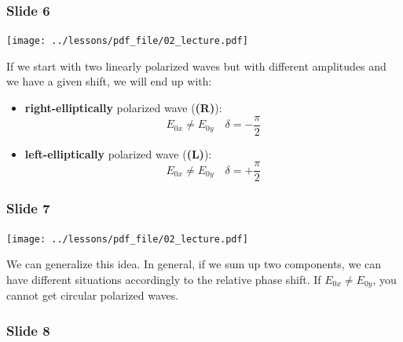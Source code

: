 \documentclass[../main/main.tex]{subfiles}
\begin{document}
\subsubsection*{Slide 6}

\begin{minipage}[]{0.5\linewidth}
\centering
\texttt{[image: ../lessons/pdf\_file/02\_lecture.pdf]}
\end{minipage}
\hspace{0.3cm}\vspace{0.3cm}
\begin{minipage}[c]{0.47\linewidth}
If we start with two linearly polarized waves but with different amplitudes and we have a given shift, we will end up with:
\begin{itemize}
    \item \textbf{right-elliptically} polarized wave (\textbf{(R)}):
    \begin{equation*}
      E_{0x} \neq E_{0y} \quad \delta = - \frac{\pi }{2}
    \end{equation*}

    \item \textbf{left-elliptically} polarized wave (\textbf{(L)}):
    \begin{equation*}
      E_{0x} \neq E_{0y} \quad \delta = + \frac{\pi }{2}
    \end{equation*}
\end{itemize}

\end{minipage}

\newpage

\subsubsection*{Slide 7}

\begin{minipage}[]{0.5\linewidth}
\centering
\texttt{[image: ../lessons/pdf\_file/02\_lecture.pdf]}
\end{minipage}
\hspace{0.3cm}\vspace{0.3cm}
\begin{minipage}[c]{0.47\linewidth}
We can generalize this idea. In general, if we sum up two components, we can have different situations accordingly to the relative phase shift. If \( E_{0x} \neq E_{0y} \), you cannot get circular polarized waves.
\end{minipage}

\subsubsection*{Slide 8}
\end{document}
